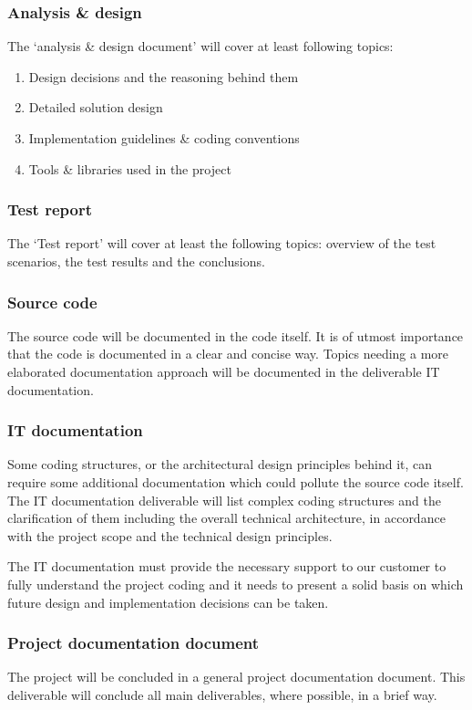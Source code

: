 \subsubsection{Analysis \& design}
The `analysis \& design document' will cover at least following topics:

	\begin{enumerate}
		\item Design decisions and the reasoning behind them
		\item Detailed solution design
		\item Implementation guidelines \& coding conventions
		\item Tools \& libraries used in the project
	\end {enumerate}

\subsubsection{Test report}
The `Test report' will cover at least the following topics: overview of the test scenarios, the test results and the conclusions.

\subsubsection{Source code}
The source code will be documented in the code itself.
It is of utmost importance that the code is documented in a clear and concise way.
Topics needing a more elaborated documentation approach will be documented in the deliverable IT documentation.

\subsubsection{IT documentation}
Some coding structures, or the architectural design principles behind it, can require some additional documentation which could pollute the source code itself.
The IT documentation deliverable will list complex coding structures and the clarification of them including the overall technical architecture, in accordance with the project scope and the technical design principles.

The IT documentation must provide the necessary support to our customer to fully understand the project coding and it needs to present a solid basis on which future design and implementation decisions can be taken.

\subsubsection{Project documentation document}
The project will be concluded in a general project documentation document.
This deliverable will conclude all main deliverables, where possible, in a brief way.

